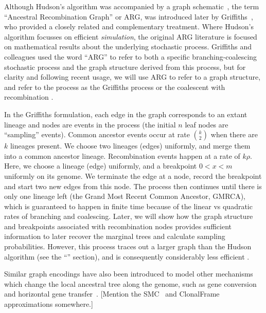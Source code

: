 \documentclass{article}
\begin{document}
Although Hudson's algorithm was accompanied by a graph
schematic~\citep[][Fig. 5]{hudson1983properties}, the term
``Ancestral Recombination Graph'' or ARG, was introduced later by
Griffiths~\citep{griffiths1991two,ethier1990two,griffiths1996ancestral, griffiths1997ancestral},
who provided a closely related and complementary treatment.
Where Hudson's algorithm focusses on efficient \emph{simulation}, the original
ARG literature is focused on mathematical results about the underlying stochastic
process. Griffiths and colleagues used the word
``ARG'' to refer to both a specific branching-coalescing stochastic process and
the graph structure derived from this process, but for clarity and following recent usage,
we will use ARG to refer to a graph structure, and refer to the
process as the Griffiths process or the coalescent with recombination
\citep{minichiello2006mapping}.

In the Griffiths formulation, each edge in the graph corresponds to an extant
lineage and nodes are events in the process (the initial $n$ leaf nodes are
``sampling'' events). Common ancestor events occur at rate $\binom{k}{2}$ when there
are $k$ lineages present. We choose two lineages (edges) uniformly, and merge them
into a common ancestor lineage. Recombination events happen at a rate of
$k \rho$. Here, we choose a lineage (edge) uniformly, and a
breakpoint $0 < x < m$ uniformly on its genome. We terminate the edge at a
node, record the breakpoint and start two new edges from this node. The process
then continues until there is only one lineage left (the Grand Most Recent
Common Ancestor, GMRCA), which is guaranteed to
happen in finite time because of the linear vs quadratic rates of branching
and coalescing. Later, we will show how the graph structure and breakpoints
associated with
recombination nodes provides sufficient information to later recover the marginal
trees and calculate sampling probabilities. However, this process traces out
a larger graph than the Hudson algorithm (see the ``'' section),
and is consequently considerably less efficient \citep{wiuf1999ancestry}.

Similar graph encodings have also been introduced to model other mechanisms
which change the local ancestral tree along the genome, such as gene
conversion~\citep{wiuf2000coalescent} and
horizontal gene transfer~\citep{baumdicker2014infinitely}.
[Mention the
SMC~\citep{mcvean2005approximating,marjoram2006fast}
and ClonalFrame~\citep{didelot2007inference} approximations somewhere.]
\end{document}
